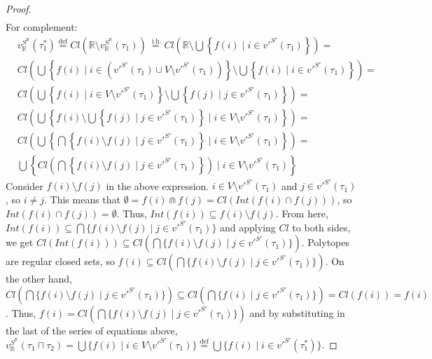 \documentclass{article}
\newcommand{\R}{\mathbb{R}}
\newcommand{\bcap}{\Cap}
\newcommand{\lcap}{\sqcap}
\newcommand{\lstar}{^*}
\newcommand{\eqdef}{\stackrel{\text{def}}{=}}
\newcommand{\eqih}{\stackrel{\text{ i.h.}}{=}}
\begin{document}
\begin{proof}
\begin{align*}
    \end{align*}
    For complement:
    \begin{align*}
      & v_\R^{S^\R}(\tau_1\lstar) \eqdef Cl\left(\R \setminus v_\R^{S^\R}(\tau_1)\right) \eqih Cl\left(\R \setminus \bigcup\left\{ f(i) \mid i \in v'^{S'}(\tau_1)\right\}\right) = \\
      & Cl\left(\bigcup\left\{ f(i) \mid i \in \left(v'^{S'}(\tau_1) \cup V \setminus v'^{S'}(\tau_1)\right)\right\} \setminus \bigcup\left\{ f(i) \mid i \in v'^{S'}(\tau_1)\right\}\right) = \\
      & Cl\left(\bigcup\left\{ f(i) \mid i \in V \setminus v'^{S'}(\tau_1)\right\} \setminus \bigcup\left\{ f(j) \mid j \in v'^{S'}(\tau_1)\right\}\right) = \\
      & Cl\left(\bigcup \left\{ f(i) \setminus \bigcup \left\{ f(j) \mid j \in v'^{S'}(\tau_1) \right\} \mid i \in V \setminus v'^{S'}(\tau_1)\right\}\right) = \\
      & Cl\left(\bigcup\left\{ \bigcap\left\{ f(i) \setminus f(j) \mid j \in v'^{S'}(\tau_1)\right\} \mid i \in V \setminus v'^{S'}(\tau_1)\right\}\right) = \\
      & \bigcup\left\{ Cl\left(\bigcap\left\{ f(i) \setminus f(j) \mid j \in v'^{S'}(\tau_1)\right\}\right) \mid i \in V \setminus v'^{S'}(\tau_1)\right\}
    \end{align*}
    Consider $f(i) \setminus f(j)$ in the above expression. $i \in V \setminus v'^{S'}(\tau_1)$ and $j \in v'^{S'}(\tau_1)$, so $i \neq j$. This means that $\emptyset = f(i) \bcap f(j) = Cl(Int(f(i) \cap f(j)))$, so \\
    $Int(f(i) \cap f(j)) = \emptyset$. Thus, $Int(f(i)) \subseteq f(i) \setminus f(j)$. From here, \\
    $Int(f(i)) \subseteq \bigcap\{ f(i) \setminus f(j) \mid j \in v'^{S'}(\tau_1)\}$ and applying $Cl$ to both sides, we get $Cl(Int(f(i))) \subseteq Cl\left(\bigcap\{ f(i) \setminus f(j) \mid j \in v'^{S'}(\tau_1)\}\right)$. Polytopes are regular closed sets, so $f(i) \subseteq Cl\left(\bigcap\{ f(i) \setminus f(j) \mid j \in v'^{S'}(\tau_1)\}\right)$. On the other hand, $Cl\left(\bigcap\{ f(i) \setminus f(j) \mid j \in v'^{S'}(\tau_1)\}\right) \subseteq Cl\left(\bigcap\{ f(i) \mid j \in v'^{S'}(\tau_1)\}\right) = Cl(f(i)) = f(i)$. Thus, $f(i) = Cl\left(\bigcap\{ f(i) \setminus f(j) \mid j \in v'^{S'}(\tau_1)\}\right)$ and by substituting in the last of the series of equations above, $v_\R^{S^\R}(\tau_1 \lcap \tau_2) = \bigcup\{ f(i) \mid i \in V \setminus v'^{S'}(\tau_1)\} \eqdef \bigcup\{ f(i) \mid i \in v'^{S'}(\tau_1\lstar)\}$.


\end{proof}
\end{document}
